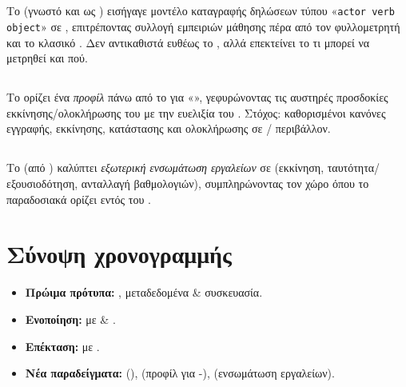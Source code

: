 \subsection*{}
Το  (γνωστό και ως ) εισήγαγε μοντέλο καταγραφής δηλώσεων τύπου «\texttt{actor verb object}» σε , επιτρέποντας συλλογή εμπειριών μάθησης πέρα από τον φυλλομετρητή και το κλασικό . Δεν αντικαθιστά ευθέως το , αλλά επεκτείνει το τι μπορεί να μετρηθεί και πού.

\subsection*{}
Το  ορίζει ένα \textit{προφίλ} πάνω από το  για «», γεφυρώνοντας τις αυστηρές προσδοκίες εκκίνησης/ολοκλήρωσης του  με την ευελιξία του . Στόχος: καθορισμένοι κανόνες εγγραφής, εκκίνησης, κατάστασης και ολοκλήρωσης σε / περιβάλλον.

\subsection*{}
Το  (από ) καλύπτει \textit{εξωτερική ενσωμάτωση εργαλείων} σε  (εκκίνηση, ταυτότητα/εξουσιοδότηση, ανταλλαγή βαθμολογιών), συμπληρώνοντας τον χώρο όπου το  παραδοσιακά ορίζει  εντός του .

\section{Σύνοψη χρονογραμμής}
\begin{itemize}
  \item \textbf{Πρώιμα πρότυπα:} ,  μεταδεδομένα \& συσκευασία.
  \item \textbf{Ενοποίηση:}  με  \&  .
  \item \textbf{Επέκταση:}  με .
  \item \textbf{Νέα παραδείγματα:}  (),  (προφίλ  για -),  (ενσωμάτωση εργαλείων).
\end{itemize}


